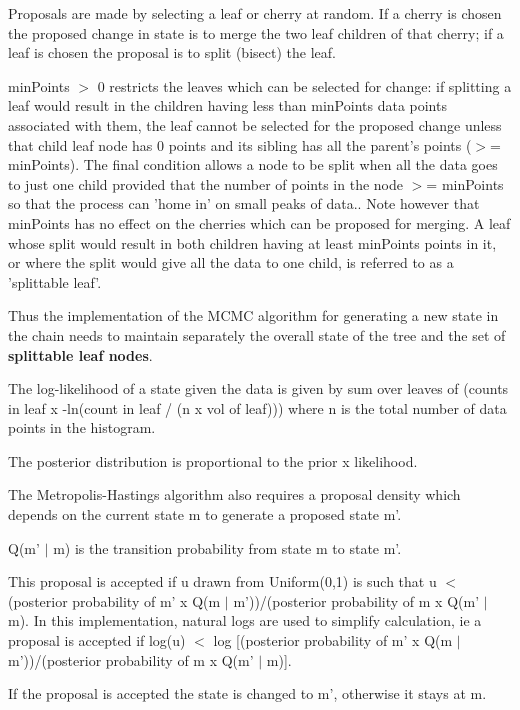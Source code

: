 \-Proposals are made by selecting a leaf or cherry at random. \-If a cherry is chosen the proposed change in state is to merge the two leaf children of that cherry; if a leaf is chosen the proposal is to split (bisect) the leaf.

min\-Points $>$ 0 restricts the leaves which can be selected for change\-: if splitting a leaf would result in the children having less than min\-Points data points associated with them, the leaf cannot be selected for the proposed change unless that child leaf node has 0 points and its sibling has all the parent's points ($>$= min\-Points). \-The final condition allows a node to be split when all the data goes to just one child provided that the number of points in the node $>$= min\-Points so that the process can 'home in' on small peaks of data.. \-Note however that min\-Points has no effect on the cherries which can be proposed for merging. \-A leaf whose split would result in both children having at least min\-Points points in it, or where the split would give all the data to one child, is referred to as a 'splittable leaf'.

\-Thus the implementation of the \-M\-C\-M\-C algorithm for generating a new state in the chain needs to maintain separately the overall state of the tree and the set of {\bfseries splittable leaf nodes}.

\-The log-\/likelihood of a state given the data is given by sum over leaves of (counts in leaf x -\/ln(count in leaf / (n x vol of leaf))) where n is the total number of data points in the histogram.

\-The posterior distribution is proportional to the prior x likelihood.

\-The \-Metropolis-\/\-Hastings algorithm also requires a proposal density which depends on the current state m to generate a proposed state m'.

\-Q(m' $|$ m) is the transition probability from state m to state m'.

\-This proposal is accepted if u drawn from \-Uniform(0,1) is such that u $<$ (posterior probability of m' x \-Q(m $|$ m'))/(posterior probability of m x \-Q(m' $|$ m). \-In this implementation, natural logs are used to simplify calculation, ie a proposal is accepted if log(u) $<$ log \mbox{[}(posterior probability of m' x \-Q(m $|$ m'))/(posterior probability of m x \-Q(m' $|$ m)\mbox{]}.

\-If the proposal is accepted the state is changed to m', otherwise it stays at m.

